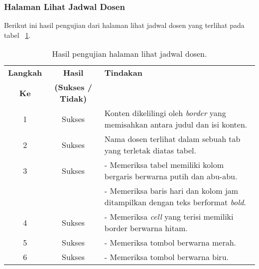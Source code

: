 \subsubsection{Halaman Lihat Jadwal Dosen}
Berikut ini hasil pengujian dari halaman lihat jadwal dosen yang terlihat pada tabel ~\ref{hasil:LihatJadwal}.
\begin{table}[H]
	\centering 
	\caption{Hasil pengujian halaman lihat jadwal dosen.}
	\label{hasil:LihatJadwal}
	\begin{tabular}{|c| c| p{}|}
		\toprule
		\textbf{Langkah} & \textbf{Hasil} & \textbf{Tindakan}\\
		\textbf{Ke} & \textbf{(Sukses / Tidak)} &\\
		\midrule
		1&Sukses&Konten dikelilingi oleh \textit{border} yang memisahkan antara judul dan isi konten.\\
		\hline
		2&Sukses& Nama dosen terlihat dalam sebuah tab yang terletak diatas tabel.\\
		\hline
		3&Sukses&- Memeriksa tabel memiliki kolom bergaris berwarna putih dan abu-abu.\\
		&& - Memeriksa baris hari dan kolom jam ditampilkan dengan teks berformat \textit{bold}.	\\	
		\hline
		4&Sukses&- Memeriksa \textit{cell} yang terisi memiliki border berwarna hitam.\\		
		\hline
		5&Sukses&- Memeriksa tombol berwarna merah.\\
		\hline
		6& Sukses & - Memeriksa tombol berwarna biru.\\
		\bottomrule		
	\end{tabular} 
\end{table}

